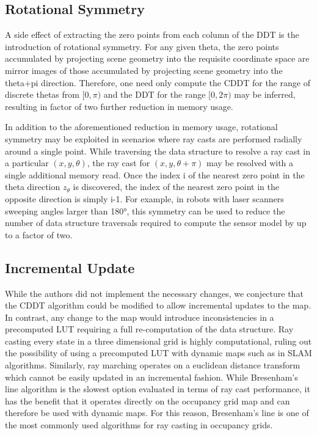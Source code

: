 \documentclass[letterpaper, 10 pt, conference]{ieeeconf}  %
\begin{document}
\subsection{Rotational Symmetry}

A side effect of extracting the zero points from each column of the DDT is the introduction of rotational symmetry. For any given theta, the zero points accumulated by projecting scene geometry into the requisite coordinate space are mirror images of those accumulated by projecting scene geometry into the theta+pi direction. Therefore, one need only compute the CDDT for the range of discrete thetas from $[0,\pi)$ and the DDT for the range $[0,2\pi)$ may be inferred, resulting in factor of two further reduction in memory usage.

In addition to the aforementioned reduction in memory usage, rotational symmetry may be exploited in scenarios where ray casts are performed radially around a single point. While traversing the data structure to resolve a ray cast in a particular $(x,y,\theta)$, the ray cast for $(x,y,\theta+\pi)$ may be resolved with a single additional memory read. Once the index i of the nearest zero point in the theta direction $z_{\theta}$ is discovered, the index of the nearest zero point in the opposite direction is simply i-1. For example, in robots with laser scanners sweeping angles larger than 180°, this symmetry can be used to reduce the number of data structure traversals required to compute the sensor model by up to a factor of two.

\subsection{Incremental Update}

While the authors did not implement the necessary changes, we conjecture that the CDDT algorithm could be modified to allow incremental updates to the map. In contrast, any change to the map would introduce inconsistencies in a precomputed LUT requiring a full re-computation of the data structure. Ray casting every state in a three dimensional grid is highly computational, ruling out the possibility of using a precomputed LUT with dynamic maps such as in SLAM algorithms. Similarly, ray marching operates on a euclidean distance transform which cannot be easily updated in an incremental fashion. While Bresenham’s line algorithm is the slowest option evaluated in terms of ray cast performance, it has the benefit that it operates directly on the occupancy grid map and can therefore be used with dynamic maps. For this reason, Bresenham’s line is one of the most commonly used algorithms for ray casting in occupancy grids.
\end{document}
